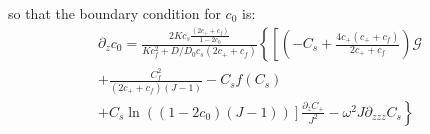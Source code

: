 \documentclass[12pt]{extarticle}
\begin{document}
so that the boundary condition for $c_0$ is:
\begin{equation}
\begin{aligned}
\partial_z c_0= \frac{2K c_s\frac{(2c_++c_f)}{1-2c_0}}{Kc_f^2+D/D_0c_s(2c_++c_f)}\left\{\left[\left(-C_s+\frac{4c_+(c_++c_f)}{2c_++c_f}\right)\mathcal{G}\right.\right.\\
\left.\left.+\frac{C_f^2}{(2c_++c_f)(J-1)}-C_sf(C_s)\right.\right.\\
\left.\left.+C_s\ln\left((1-2c_0)(J-1)\right)\right]\frac{\partial_z C_+}{J^2}-\omega^2J\partial_{zzz}C_s\right\}
\end{aligned}
\end{equation}
\end{document}
